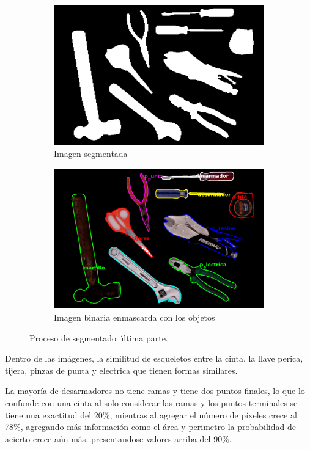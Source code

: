 \documentclass[a4paper, 11pt]{article}
\begin{document}
\begin{figure}[h]
  \begin{subfigure}{0.5\linewidth}
    \includegraphics[width=\linewidth]{paso9}
    \caption{Imagen segmentada}
    \label{fig:1a}
  \end{subfigure}\hfill
  \begin{subfigure}{0.5\linewidth}
    \includegraphics[width=\linewidth]{paso10}
    \caption{Imagen binaria enmascarda con los objetos}
    \label{fig:1a}
  \end{subfigure}
  \caption{Proceso de segmentado última parte.}
  \label{fig:1}
\end{figure}

Dentro de las imágenes, la similitud de esqueletos entre la cinta, la llave perica, tijera, pinzas de punta y electrica que tienen formas similares.

La mayoría de desarmadores no tiene ramas y tiene dos puntos finales, lo que lo confunde con una cinta al solo considerar las ramas y los puntos terminales se tiene una exactitud del 20\%, mientras al agregar el número de píxeles crece al 78\%, agregando más información como el área y perimetro la probabilidad de acierto crece aún más, presentandose valores arriba del 90\%.
\end{document}
